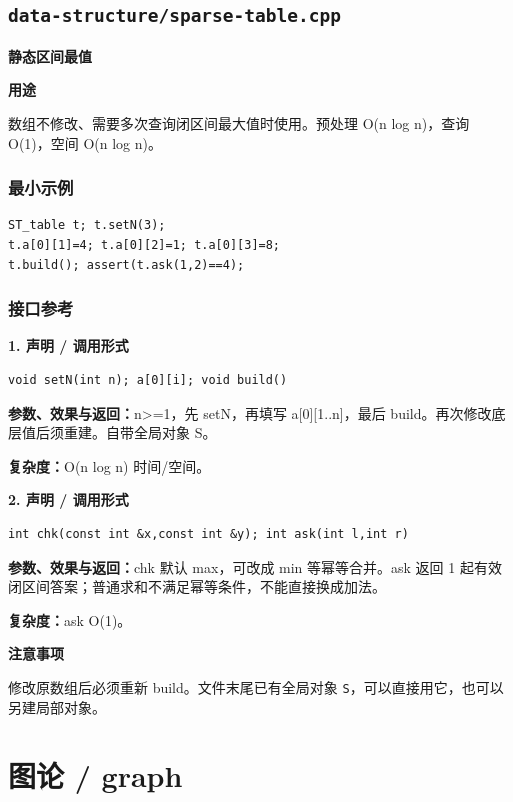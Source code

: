 \documentclass[UTF8,a4paper,10pt]{ctexart}
\newcommand{\TemplUsage}[1]{\textbf{用途}\par #1\par}
\newcommand{\TemplNote}[1]{\textbf{注意事项}\par #1\par}
\begin{document}
\subsection{\texttt{data-structure/sparse-table.cpp}}
\textbf{静态区间最值}\par
\TemplUsage{数组不修改、需要多次查询闭区间最大值时使用。预处理 O(n log n)，查询 O(1)，空间 O(n log n)。}
\subsubsection*{最小示例}
\begin{lstlisting}
ST_table t; t.setN(3);
t.a[0][1]=4; t.a[0][2]=1; t.a[0][3]=8;
t.build(); assert(t.ask(1,2)==4);
\end{lstlisting}
\subsubsection*{接口参考}
\noindent\begin{minipage}{\textwidth}
\textbf{1. 声明 / 调用形式}
\begin{lstlisting}
void setN(int n); a[0][i]; void build()
\end{lstlisting}
\textbf{参数、效果与返回：}n>=1，先 setN，再填写 a[0][1..n]，最后 build。再次修改底层值后须重建。自带全局对象 S。

\textbf{复杂度：}O(n log n) 时间/空间。

\end{minipage}\par\vspace{0.4em}
\noindent\begin{minipage}{\textwidth}
\textbf{2. 声明 / 调用形式}
\begin{lstlisting}
int chk(const int &x,const int &y); int ask(int l,int r)
\end{lstlisting}
\textbf{参数、效果与返回：}chk 默认 max，可改成 min 等幂等合并。ask 返回 1 起有效闭区间答案；普通求和不满足幂等条件，不能直接换成加法。

\textbf{复杂度：}ask O(1)。

\TemplNote{修改原数组后必须重新 build。文件末尾已有全局对象 \texttt{S}，可以直接用它，也可以另建局部对象。}
\end{minipage}\par\vspace{0.4em}
\clearpage
\section{图论 / graph}
\end{document}
